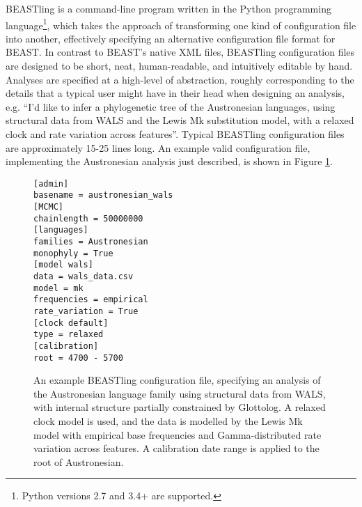 \documentclass[twocolumn,10pt]{scrartcl}
\begin{document}
BEASTling is a command-line program written in the Python programming language\footnote{Python versions 2.7 and 3.4+ are supported.}, which takes the approach of transforming one kind of configuration file into another, effectively specifying an alternative configuration file format for BEAST.  In contrast to BEAST's native XML files, BEASTling configuration files are designed to be short, neat, human-readable, and intuitively editable by hand.  Analyses are specified at a high-level of abstraction, roughly corresponding to the details that a typical user might have in their head when designing an analysis, e.g. ``I'd like to infer a phylogenetic tree of the Austronesian languages, using structural data from WALS and the Lewis Mk substitution model, with a relaxed clock and rate variation across features''.  Typical BEASTling configuration files are approximately 15-25 lines long.  An example valid configuration file, implementing the Austronesian analysis just described, is shown in Figure \ref{fig:config}.

\begin{figure}[t]
	\begin{verbatim}[admin]
basename = austronesian_wals
[MCMC]
chainlength = 50000000
[languages]
families = Austronesian
monophyly = True
[model wals]
data = wals_data.csv
model = mk
frequencies = empirical
rate_variation = True
[clock default]
type = relaxed
[calibration]
root = 4700 - 5700\end{verbatim}
	\caption{An example BEASTling configuration file, specifying an analysis of the Austronesian language family using structural data from WALS, with internal structure partially constrained by Glottolog. A relaxed clock model is used, and the data is modelled by the Lewis Mk model with empirical base frequencies and Gamma-distributed rate variation across features.  A calibration date range is applied to the root of Austronesian.}
\label{fig:config}
\end{figure}
\end{document}
